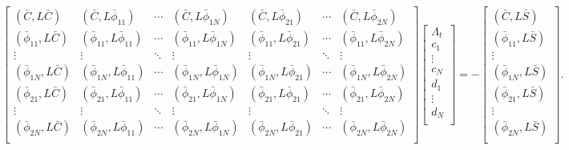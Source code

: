 \documentclass[Dissertation.tex]{subfiles}
\begin{document}
\begin{equation}
\label{eq:PWaveKohnMatrix}
\begin{bmatrix} 
 (\bar{C},L\bar{C}) & (\bar{C},L\bar{\phi}_{11}) & \cdots & (\bar{C},L\bar{\phi}_{1N}) & (\bar{C},L\bar{\phi}_{21}) & \cdots & (\bar{C},L\bar{\phi}_{2N})\\
 (\bar{\phi}_{11},L\bar{C}) & (\bar{\phi}_{11},L\bar{\phi}_{11}) & \cdots & (\bar{\phi}_{11},L\bar{\phi}_{1N}) & (\bar{\phi}_{11},L\bar{\phi}_{21}) & \cdots & (\bar{\phi}_{11},L\bar{\phi}_{2N})\\
 \vdots & \vdots & \ddots & \vdots & \vdots & \ddots & \vdots \\
 (\bar{\phi}_{1N},L\bar{C}) & (\bar{\phi}_{1N},L\bar{\phi}_{11}) & \cdots & (\bar{\phi}_{1N},L\bar{\phi}_{1N}) & (\bar{\phi}_{1N},L\bar{\phi}_{21}) & \cdots & (\bar{\phi}_{1N},L\bar{\phi}_{2N})\\
 (\bar{\phi}_{21},L\bar{C}) & (\bar{\phi}_{21},L\bar{\phi}_{11}) & \cdots & (\bar{\phi}_{21},L\bar{\phi}_{1N}) & (\bar{\phi}_{21},L\bar{\phi}_{21}) & \cdots & (\bar{\phi}_{21},L\bar{\phi}_{2N})\\
 \vdots & \vdots & \ddots & \vdots & \vdots & \ddots & \vdots \\
 (\bar{\phi}_{2N},L\bar{C}) & (\bar{\phi}_{2N},L\bar{\phi}_{11}) & \cdots & (\bar{\phi}_{2N},L\bar{\phi}_{1N}) & (\bar{\phi}_{2N},L\bar{\phi}_{21}) & \cdots & (\bar{\phi}_{2N},L\bar{\phi}_{2N})\\
\end{bmatrix}
\begin{bmatrix}
\Lambda_t\\
c_1\\
\vdots\\
c_N\\
d_1\\
\vdots\\
d_N\\
\end{bmatrix}
= -
\begin{bmatrix}
(\bar{C},L\bar{S}) \\
(\bar{\phi}_{11},L\bar{S}) \\
\vdots \\
(\bar{\phi}_{1N},L\bar{S}) \\
(\bar{\phi}_{21},L\bar{S}) \\
\vdots \\
(\bar{\phi}_{2N},L\bar{S}) \\
\end{bmatrix}.
\end{equation}
\end{document}
